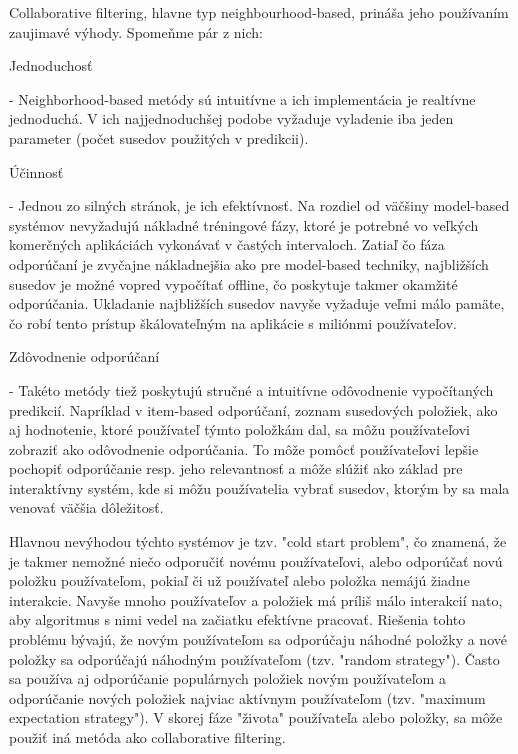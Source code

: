 Collaborative filtering, hlavne typ neighbourhood-based, prináša jeho používaním zaujimavé výhody. Spomeňme pár z nich:
\begin{itemize}[leftmargin=*]
	{\bf \item Jednoduchosť} - Neighborhood-based metódy sú intuitívne a ich implementácia je realtívne jednoduchá. V ich najjednoduchšej podobe vyžaduje vyladenie iba jeden parameter (počet susedov použitých v predikcii).
	{\bf \item Účinnosť} - Jednou zo silných stránok, je ich efektívnosť. Na rozdiel od väčšiny model-based systémov nevyžadujú nákladné tréningové fázy, ktoré je potrebné vo veľkých komerčných aplikáciách vykonávať v častých intervaloch. Zatiaľ čo fáza odporúčaní je zvyčajne nákladnejšia ako pre model-based techniky, najbližších susedov je možné vopred vypočítať offline, čo poskytuje takmer okamžité odporúčania. Ukladanie najbližších susedov navyše vyžaduje veľmi málo pamäte, čo robí tento prístup škálovateľným na aplikácie s miliónmi používateľov.
	{\bf \item Zdôvodnenie odporúčaní} - Takéto metódy tiež poskytujú stručné a intuitívne odôvodnenie vypočítaných predikcií. Napríklad v item-based odporúčaní, zoznam susedových položiek, ako aj hodnotenie, ktoré používateľ týmto položkám dal, sa môžu používateľovi zobraziť ako odôvodnenie odporúčania. To môže pomôcť používateľovi lepšie pochopiť odporúčanie resp. jeho relevantnosť a môže slúžiť ako základ pre interaktívny systém, kde si môžu používatelia vybrať susedov, ktorým by sa mala venovať väčšia dôležitosť.
\end{itemize}


Hlavnou nevýhodou týchto systémov je tzv. "cold start problem", čo znamená, že je takmer nemožné niečo odporučiť novému používateľovi, alebo odporúčať novú položku používateľom, pokiaľ či už používateľ alebo položka nemájú žiadne interakcie. Navyše mnoho používateľov a položiek má príliš málo interakcií nato, aby algoritmus s nimi vedel na začiatku efektívne pracovať. Riešenia tohto problému bývajú, že novým používateľom sa odporúčaju náhodné položky a nové položky sa odporúčajú náhodným používateľom (tzv. "random strategy"). Často sa používa aj odporúčanie populárnych položiek novým používateľom a odporúčanie nových položiek najviac aktívnym používateľom (tzv. "maximum expectation strategy"). V skorej fáze "života" používateľa alebo položky, sa môže použiť iná metóda ako collaborative filtering. \\
	
 
